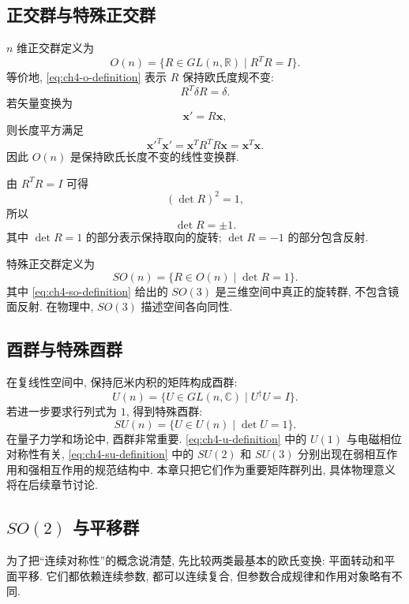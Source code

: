 \subsection{正交群与特殊正交群}

$n$ 维正交群定义为
\begin{equation}
\label{eq:ch4-o-definition}
O(n)
=
\{R\in GL(n,\mathbb{R})\mid R^TR=I\}.
\end{equation}
等价地, \eqref{eq:ch4-o-definition} 表示 $R$ 保持欧氏度规不变: 
\[
R^T\delta R=\delta.
\]
若矢量变换为
\[
\bm{x}'=R\bm{x},
\]
则长度平方满足
\[
\bm{x}'^T\bm{x}'
=
\bm{x}^TR^TR\bm{x}
=
\bm{x}^T\bm{x}.
\]
因此 $O(n)$ 是保持欧氏长度不变的线性变换群. 

由 $R^TR=I$ 可得
\[
(\det R)^2=1,
\]
所以
\[
\det R=\pm 1.
\]
其中 $\det R=1$ 的部分表示保持取向的旋转; $\det R=-1$ 的部分包含反射. 

特殊正交群定义为
\begin{equation}
\label{eq:ch4-so-definition}
SO(n)
=
\{R\in O(n)\mid \det R=1\}.
\end{equation}
其中 \eqref{eq:ch4-so-definition} 给出的 $SO(3)$ 是三维空间中真正的旋转群, 不包含镜面反射. 在物理中, $SO(3)$ 描述空间各向同性. 

\subsection{酉群与特殊酉群}

在复线性空间中, 保持厄米内积的矩阵构成酉群: 
\begin{equation}
\label{eq:ch4-u-definition}
U(n)
=
\{U\in GL(n,\mathbb{C})\mid U^\dagger U=I\}.
\end{equation}
若进一步要求行列式为 $1$, 得到特殊酉群: 
\begin{equation}
\label{eq:ch4-su-definition}
SU(n)
=
\{U\in U(n)\mid \det U=1\}.
\end{equation}
在量子力学和场论中, 酉群非常重要. \eqref{eq:ch4-u-definition} 中的 $U(1)$ 与电磁相位对称性有关, \eqref{eq:ch4-su-definition} 中的 $SU(2)$ 和 $SU(3)$ 分别出现在弱相互作用和强相互作用的规范结构中. 本章只把它们作为重要矩阵群列出, 具体物理意义将在后续章节讨论. 

\subsection{\texorpdfstring{$SO(2)$ 与平移群}{SO(2) 与平移群}}

为了把“连续对称性”的概念说清楚, 先比较两类最基本的欧氏变换: 平面转动和平面平移. 它们都依赖连续参数, 都可以连续复合, 但参数合成规律和作用对象略有不同. 

